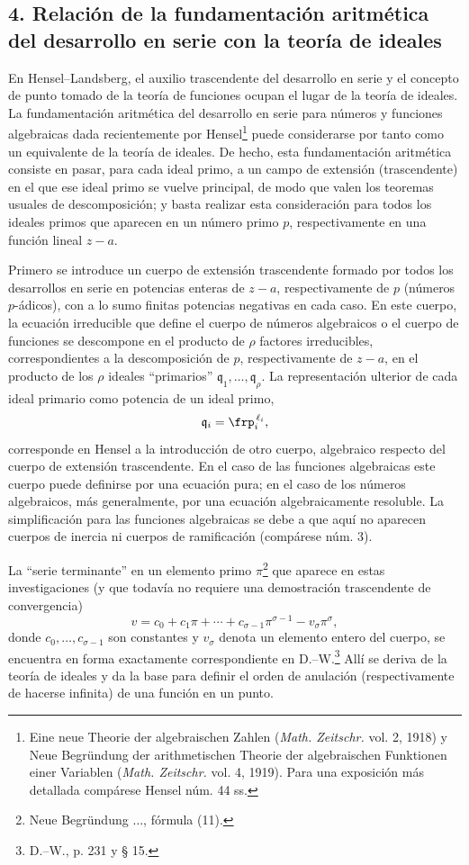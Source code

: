 \documentclass[11pt]{article}
\begin{document}
\subsection*{4. Relación de la fundamentación aritmética del desarrollo en serie con la teoría de ideales}
En Hensel--Landsberg, el auxilio trascendente del desarrollo en serie y el concepto de punto tomado de la teoría de funciones ocupan el lugar de la teoría de ideales. La fundamentación aritmética del desarrollo en serie para números y funciones algebraicas dada recientemente por Hensel\footnote{Eine neue Theorie der algebraischen Zahlen (\emph{Math. Zeitschr.} vol. 2, 1918) y Neue Begründung der arithmetischen Theorie der algebraischen Funktionen einer Variablen (\emph{Math. Zeitschr.} vol. 4, 1919). Para una exposición más detallada compárese Hensel núm. 44 ss.} puede considerarse por tanto como un equivalente de la teoría de ideales. De hecho, esta fundamentación aritmética consiste en pasar, para cada ideal primo, a un campo de extensión (trascendente) en el que ese ideal primo se vuelve principal, de modo que valen los teoremas usuales de descomposición; y basta realizar esta consideración para todos los ideales primos que aparecen en un número primo \(p\), respectivamente en una función lineal \(z-a\).

Primero se introduce un cuerpo de extensión trascendente formado por todos los desarrollos en serie en potencias enteras de \(z-a\), respectivamente de \(p\) (números \(p\)-ádicos), con a lo sumo finitas potencias negativas en cada caso. En este cuerpo, la ecuación irreducible que define el cuerpo de números algebraicos o el cuerpo de funciones se descompone en el producto de \(\rho\) factores irreducibles, correspondientes a la descomposición de \(p\), respectivamente de \(z-a\), en el producto de los \(\rho\) ideales ``primarios'' \(\mathfrak q_1,\ldots,\mathfrak q_\rho\). La representación ulterior de cada ideal primario como potencia de un ideal primo,
\[
\mathfrak q_i=\frp_i^{\,\ell_i},
\]
corresponde en Hensel a la introducción de otro cuerpo, algebraico respecto del cuerpo de extensión trascendente. En el caso de las funciones algebraicas este cuerpo puede definirse por una ecuación pura; en el caso de los números algebraicos, más generalmente, por una ecuación algebraicamente resoluble. La simplificación para las funciones algebraicas se debe a que aquí no aparecen cuerpos de inercia ni cuerpos de ramificación (compárese núm. 3).

La ``serie terminante'' en un elemento primo \(\pi\)\footnote{Neue Begründung \(\ldots\), fórmula (11).} que aparece en estas investigaciones (y que todavía no requiere una demostración trascendente de convergencia)
\[
v=c_0+c_1\pi+\cdots+c_{\sigma-1}\pi^{\sigma-1}-v_\sigma\pi^\sigma,
\]
donde \(c_0,\ldots,c_{\sigma-1}\) son constantes y \(v_\sigma\) denota un elemento entero del cuerpo, se encuentra en forma exactamente correspondiente en D.--W.\footnote{D.--W., p. 231 y § 15.} Allí se deriva de la teoría de ideales y da la base para definir el orden de anulación (respectivamente de hacerse infinita) de una función en un punto.
\end{document}
